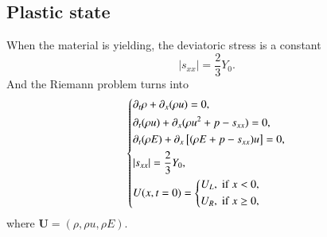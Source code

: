 \documentclass[review]{elsarticle}
\begin{document}
\subsection{Plastic state}
When the material is yielding, the deviatoric stress is a constant
\begin{equation}
  |s_{xx}| = \frac{2}{3}Y_0.
\end{equation}
And the Riemann problem turns into 
\begin{equation}\label{eq:1dp}
   \left\{ \begin{aligned}
       & \partial _t \rho +\partial_x(\rho u)=0,\\
       & \partial _t (\rho u)+\partial_x(\rho u^2 + p -s_{xx})=0,\\
       &\partial _t (\rho E)+\partial_x\left[(\rho E + p -s_{xx})u\right]=0,\\
& |s_{xx}| = \frac{2}{3}Y_{0}, \\
       &U(x,t = 0) = \left\{\begin{aligned}
           U_L, \hspace{0.1cm} \text{if} \hspace{0.1cm} x<0, \\
           U_R, \hspace{0.1cm} \text{if} \hspace{0.1cm} x\ge 0, \\
       \end{aligned}\right.
     \end{aligned}
  \right.
\end{equation}
where $\mathbf{U} = (\rho, \rho u, \rho E )$.
\end{document}
